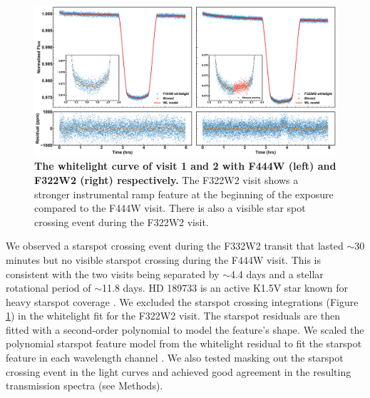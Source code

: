 \documentclass[sn-standardnature]{sn-jnl}%
\begin{document}
\begin{figure}
\centering
  \includegraphics[width=\textwidth,keepaspectratio]{figs/Fig1.pdf}
  \caption{\textbf{The whitelight curve of visit 1 and 2 with F444W (left) and F322W2 (right) respectively.} The F322W2 visit shows a stronger instrumental ramp feature at the beginning of the exposure compared to the F444W visit. There is also a visible star spot crossing event during the F322W2 visit.}
  \label{fig:wl}
\end{figure}



We observed a starspot crossing event during the F332W2 transit that lasted $\sim$30 minutes but no visible starspot crossing during the F444W visit. This is consistent with the two visits being separated by $\sim$4.4 days and a stellar rotational period of $\sim$11.8 days. HD 189733 is an active K1.5V star known for heavy starspot coverage \cite{sing_hubble_2011}. We excluded the starspot crossing integrations (Figure \ref{fig:wl}) in the whitelight fit for the F322W2 visit. The starspot residuals are then fitted with a second-order polynomial to model the feature's shape. We scaled the polynomial starspot feature model from the whitelight residual to fit the starspot feature in each wavelength channel \cite{sing_hubble_2011, fu_water_2022}. We also tested masking out the starspot crossing event in the light curves and achieved good agreement in the resulting transmission spectra (see Methods). \\
\end{document}
